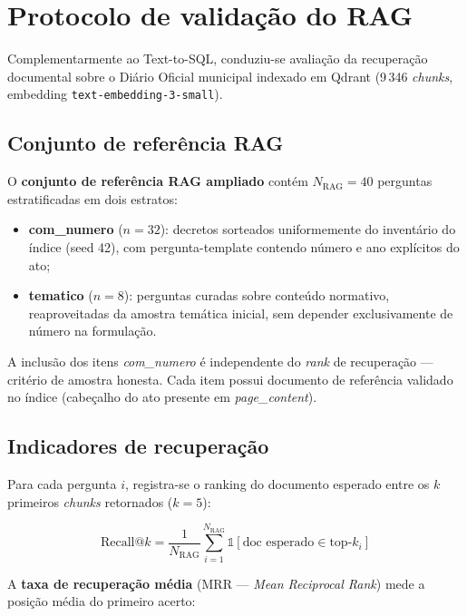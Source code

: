 \section{Protocolo de validação do RAG}

Complementarmente ao Text-to-SQL, conduziu-se avaliação da recuperação documental sobre o Diário Oficial municipal indexado em Qdrant (9\,346 \textit{chunks}, embedding \texttt{text-embedding-3-small}).

\subsection{Conjunto de referência RAG}

O \textbf{conjunto de referência RAG ampliado} contém $N_{\text{RAG}} = 40$ perguntas estratificadas em dois estratos:

\begin{itemize}
    \item \textbf{com\_numero} ($n = 32$): decretos sorteados uniformemente do inventário do índice (seed 42), com pergunta-template contendo número e ano explícitos do ato;
    \item \textbf{tematico} ($n = 8$): perguntas curadas sobre conteúdo normativo, reaproveitadas da amostra temática inicial, sem depender exclusivamente de número na formulação.
\end{itemize}

A inclusão dos itens \textit{com\_numero} é independente do \textit{rank} de recuperação --- critério de amostra honesta. Cada item possui documento de referência validado no índice (cabeçalho do ato presente em \textit{page\_content}).

\subsection{Indicadores de recuperação}

Para cada pergunta $i$, registra-se o ranking do documento esperado entre os $k$ primeiros \textit{chunks} retornados ($k = 5$):

\begin{equation}
\text{Recall@}k = \frac{1}{N_{\text{RAG}}} \sum_{i=1}^{N_{\text{RAG}}} \mathbb{1}\!\left[\text{doc esperado} \in \text{top-}k_i\right]
\end{equation}

A \textbf{taxa de recuperação média} (MRR --- \textit{Mean Reciprocal Rank}) mede a posição média do primeiro acerto:

